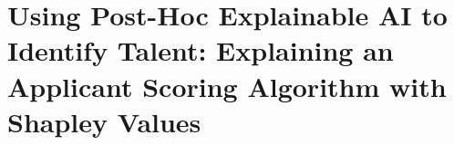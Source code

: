 

\chapter{\label{ch:usingxai}Using Post-Hoc Explainable AI to Identify Talent: Explaining an Applicant Scoring Algorithm with Shapley Values}

